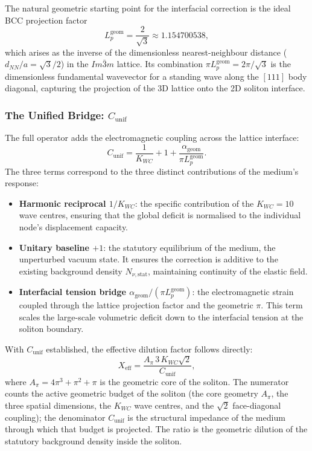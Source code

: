 \documentclass[10pt,a4paper]{article}
\begin{document}
The natural geometric starting point for the interfacial correction is the ideal BCC projection factor
\begin{equation}
	L_p^{\text{geom}} = \frac{2}{\sqrt{3}} \approx 1.154700538,
\end{equation}
which arises as the inverse of the dimensionless nearest-neighbour distance (\(d_{NN}/a = \sqrt{3}/2\)) in the \(Im\bar{3}m\) lattice. Its combination \(\pi L_p^{\text{geom}} = 2\pi/\sqrt{3}\) is the dimensionless fundamental wavevector for a standing wave along the \([111]\) body diagonal, capturing the projection of the 3D lattice onto the 2D soliton interface.

\subsubsection*{The Unified Bridge: \(C_{\text{unif}}\)}

The full operator adds the electromagnetic coupling across the lattice interface:
\begin{equation}
	C_{\text{unif}}
	=
	\frac{1}{K_{WC}}
	+
	1
	+
	\frac{\alpha_{\text{geom}}}{\pi L_p^{\text{geom}}}.
	\label{eq:C_unif}
\end{equation}
The three terms correspond to the three distinct contributions of the medium's response:

\begin{itemize}
	\item \textbf{Harmonic reciprocal \(1/K_{WC}\)}: the specific contribution of the \(K_{WC}=10\) wave centres, ensuring that the global deficit is normalised to the individual node's displacement capacity.
	
	\item \textbf{Unitary baseline \(+1\)}: the statutory equilibrium of the medium, the unperturbed vacuum state. It ensures the correction is additive to the existing background density \(N_{\nu,\text{stat}}\), maintaining continuity of the elastic field.
	
	\item \textbf{Interfacial tension bridge \(\alpha_{\text{geom}}/(\pi L_p^{\text{geom}})\)}: the electromagnetic strain coupled through the lattice projection factor and the geometric \(\pi\). This term scales the large-scale volumetric deficit down to the interfacial tension at the soliton boundary.
\end{itemize}

With \(C_{\text{unif}}\) established, the effective dilution factor follows directly:
\begin{equation}
	\label{eq:x_eff}
	X_{\text{eff}}
	=
	\frac{A_\pi \, 3 \, K_{WC} \sqrt{2}}{C_{\text{unif}}},
\end{equation}
where \(A_\pi = 4\pi^3 + \pi^2 + \pi\) is the geometric core of the soliton. The numerator counts the active geometric budget of the soliton (the core geometry \(A_\pi\), the three spatial dimensions, the \(K_{WC}\) wave centres, and the \(\sqrt{2}\) face-diagonal coupling); the denominator \(C_{\text{unif}}\) is the structural impedance of the medium through which that budget is projected. The ratio is the geometric dilution of the statutory background density inside the soliton.
\end{document}
